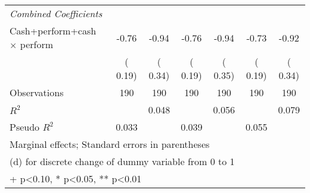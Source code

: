 {\begin{tabular}{l*{6}{c}}
\midrule
\multicolumn{7}{l}{\textit{Combined Coefficients}}\\
Cash+perform+cash $\times$ perform &     -0.76 &     -0.94 &     -0.76 &    -0.94 &     -0.73&     -0.92 \\
 &  (     0.19)&  (     0.34)&  (     0.19)&  (     0.35)&  (     0.19)&(     0.34)\\
\bottomrule
Observations    &      190  &      190  &      190  &      190  &      190  &      190  \\
\(R^{2}\)       &           &    0.048  &           &    0.056  &           &    0.079  \\
Pseudo \(R^{2}\)&    0.033  &           &    0.039  &           &    0.055  &           \\
\bottomrule
\multicolumn{7}{l}{\footnotesize Marginal effects; Standard errors in parentheses}\\
\multicolumn{7}{l}{\footnotesize  (d) for discrete change of dummy variable from 0 to 1}\\
\multicolumn{7}{l}{\footnotesize + p<0.10, * p<0.05, ** p<0.01}\\
\end{tabular}
}
